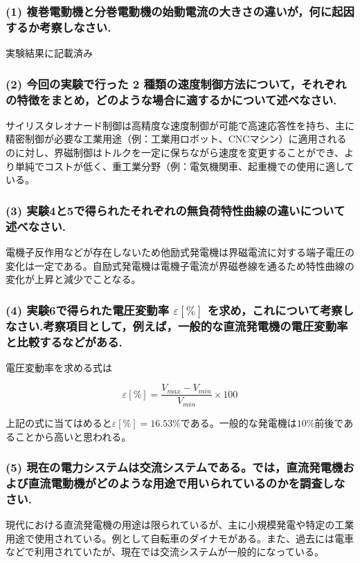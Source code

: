 \documentclass[a4paper,11pt,xelatex,ja=standard]{bxjsarticle}
\begin{document}
    \subsubsection*{(1) 複巻電動機と分巻電動機の始動電流の大きさの違いが，何に起因するか考察しなさい.}

    実験結果に記載済み

    \subsubsection*{(2) 今回の実験で行った 2 種類の速度制御方法について，それぞれの特徴をまとめ，どのような場合に適するかについて述べなさい.}

    サイリスタレオナード制御は高精度な速度制御が可能で高速応答性を持ち、主に精密制御が必要な工業用途（例：工業用ロボット、CNCマシン）に適用されるのに対し、界磁制御はトルクを一定に保ちながら速度を変更することができ、より単純でコストが低く、重工業分野（例：電気機関車、起重機での使用に適している。

    \subsubsection*{(3) 実験4と5で得られたそれぞれの無負荷特性曲線の違いについて述べなさい.}

    電機子反作用などが存在しないため他励式発電機は界磁電流に対する端子電圧の変化は一定である。自励式発電機は電機子電流が界磁巻線を通るため特性曲線の変化が上昇と減少でことなる。

    \subsubsection*{(4) 実験6で得られた電圧変動率 $\varepsilon[\%]$ を求め，これについて考察しなさい.考察項目として，例えば，一般的な直流発電機の電圧変動率と比較するなどがある.}

    電圧変動率を求める式は

    $$
    \varepsilon[\%] = \frac{V_{max} - V_{min}}{V_{min}} \times 100
    $$

    上記の式に当てはめると$\varepsilon[\%] = 16.53 \%$である。一般的な発電機は$10\%$前後であることから高いと思われる。

    \subsubsection*{(5) 現在の電力システムは交流システムである。では，直流発電機および直流電動機がどのような用途で用いられているのかを調査しなさい.}

    現代における直流発電機の用途は限られているが、主に小規模発電や特定の工業用途で使用されている。例として自転車のダイナモがある。また、過去には電車などで利用されていたが、現在では交流システムが一般的になっている。
\end{document}
